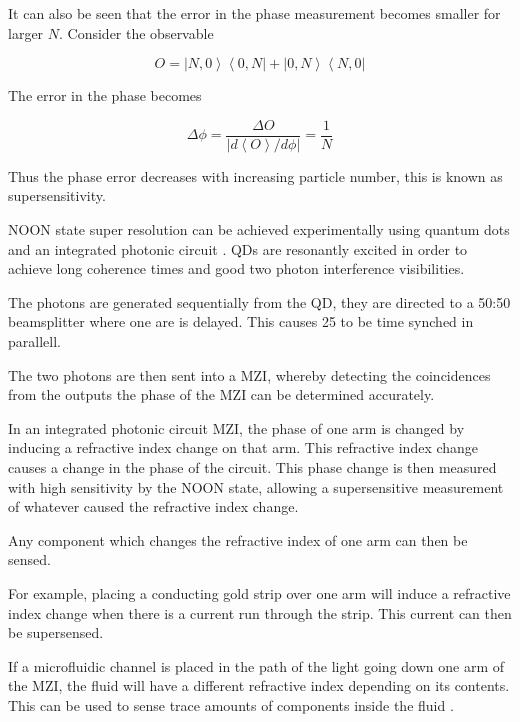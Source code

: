 It can also be seen that the error in the phase measurement becomes smaller for
larger $N$. Consider the observable

\begin{equation} O = \left|N, 0\right\rangle \left\langle 0, N\right| + \left|0,
N\right\rangle \left\langle N, 0\right| \end{equation}

The error in the phase becomes

\begin{equation} \Delta \phi = \frac{\Delta O}{ | d \left\langle O \right\rangle /
d \phi | } = \frac{1}{N} \end{equation}

Thus the phase error decreases with increasing particle number, this is known as
supersensitivity.

NOON state super resolution can be achieved experimentally using quantum dots
and an integrated photonic circuit \cite{bennett2015cavity}. QDs are resonantly
excited in order to achieve long coherence times and good two photon
interference visibilities.

The photons are generated sequentially from the QD, they are directed to a 50:50
beamsplitter where one are is delayed. This causes 25%
to be time synched in parallell.

The two photons are then sent into a MZI, whereby detecting the coincidences
from the outputs the phase of the MZI can be determined accurately.

In an integrated photonic circuit MZI, the phase of one arm is changed by
inducing a refractive index change on that arm. This refractive index change
causes a change in the phase of the circuit. This phase change is then measured
with high sensitivity by the NOON state, allowing a supersensitive measurement
of whatever caused the refractive index change.

Any component which changes the refractive index of one arm can then be sensed.

For example, placing a conducting gold strip over one arm will induce a refractive
index change when there is a current run through the strip. This current can then be
supersensed.

If a microfluidic channel is placed in the path of the light going down one arm of
the MZI, the fluid will have a different refractive index depending on its contents.
This can be used to sense trace amounts of components inside the fluid \cite{crespi2012measuring}.

